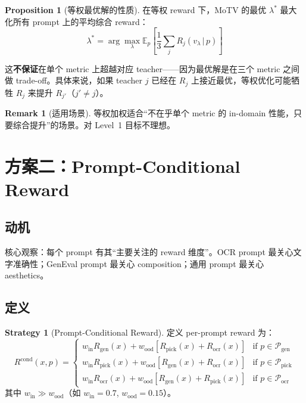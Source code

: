 \documentclass[11pt,a4paper]{article}
\newcommand{\E}{\mathbb{E}}
\newcommand{\reward}{R}
\theoremstyle{definition}
\newtheorem{remark}{Remark}
\newtheorem{proposition}{Proposition}
\newtheorem{strategy}{Strategy}
\begin{document}
\begin{proposition}[等权最优解的性质]
在等权 reward 下，MoTV 的最优 $\lambda^*$ 最大化所有 prompt 上的平均综合 reward：
\begin{equation}
\lambda^* = \arg\max_\lambda \E_p\!\left[\frac{1}{3}\sum_j R_j(v_\lambda \,|\, p)\right]
\end{equation}

这\textbf{不保证}在单个 metric 上超越对应 teacher——因为最优解是在三个 metric 之间做 trade-off。具体来说，如果 teacher $j$ 已经在 $R_j$ 上接近最优，等权优化可能牺牲 $R_j$ 来提升 $R_{j'}$（$j' \neq j$）。
\end{proposition}

\begin{remark}[适用场景]
等权加权适合``不在乎单个 metric 的 in-domain 性能，只要综合提升''的场景。对 Level~1 目标不理想。
\end{remark}

\section{方案二：Prompt-Conditional Reward}
\label{sec:conditional}

\subsection{动机}

核心观察：每个 prompt 有其``主要关注的 reward 维度''。OCR prompt 最关心文字准确性；GenEval prompt 最关心 composition；通用 prompt 最关心 aesthetics。

\subsection{定义}

\begin{strategy}[Prompt-Conditional Reward]
\label{strat:conditional}
定义 per-prompt reward 为：
\begin{equation}
\reward^{\mathrm{cond}}(x, p) = \begin{cases}
w_{\mathrm{in}} R_{\mathrm{gen}}(x) + w_{\mathrm{ood}} \left[R_{\mathrm{pick}}(x) + R_{\mathrm{ocr}}(x)\right] & \text{if } p \in \mathcal{P}_{\mathrm{gen}} \\
w_{\mathrm{in}} R_{\mathrm{pick}}(x) + w_{\mathrm{ood}} \left[R_{\mathrm{gen}}(x) + R_{\mathrm{ocr}}(x)\right] & \text{if } p \in \mathcal{P}_{\mathrm{pick}} \\
w_{\mathrm{in}} R_{\mathrm{ocr}}(x) + w_{\mathrm{ood}} \left[R_{\mathrm{gen}}(x) + R_{\mathrm{pick}}(x)\right] & \text{if } p \in \mathcal{P}_{\mathrm{ocr}}
\end{cases}
\label{eq:cond_reward}
\end{equation}
其中 $w_{\mathrm{in}} \gg w_{\mathrm{ood}}$（如 $w_{\mathrm{in}} = 0.7$, $w_{\mathrm{ood}} = 0.15$）。
\end{strategy}
\end{document}
